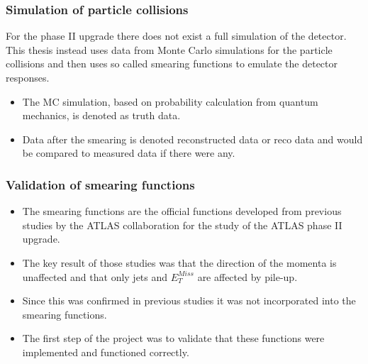 \documentclass[handout]{beamer}
\begin{document}
\begin{frame}[shrink=10]\frametitle{Simulation of particle collisions}
\begin{block}{}
For the phase II upgrade there does not exist a full simulation of the detector. This thesis instead uses data from Monte Carlo simulations for the particle collisions and then uses so called smearing functions to emulate the detector responses.
\end{block}
\begin{block}{}
\begin{itemize}
\item The MC simulation, based on probability calculation from quantum mechanics, is denoted as truth data.
\item Data after the smearing is denoted reconstructed data or reco data and would be compared to measured data if there were any.
\end{itemize}
\end{block}
\end{frame}



\begin{frame}[shrink=10]\frametitle{Validation of smearing functions}
\begin{block}{}
\begin{itemize}
\item The smearing functions are the official functions developed from previous studies by the ATLAS collaboration for the study of the ATLAS phase II upgrade. 
\item The key result of those studies was that the direction of the momenta is unaffected and that only jets and $E_T^{Miss}$ are affected by pile-up.
\item Since this was confirmed in previous studies it was not incorporated into the smearing functions.
\item The first step of the project was to validate that these functions were implemented and functioned correctly.
\end{itemize}
\end{block}
\end{frame}
\end{document}
